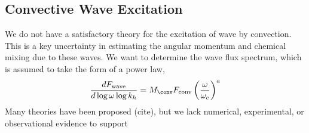 {\color{purple}
\subsection{Convective Wave Excitation}
}

We do not have a satisfactory theory for the excitation of wave by convection. This is a key uncertainty in estimating the angular momentum and chemical mixing due to these waves. We want to determine the wave flux spectrum, which is assumed to take the form of a power law,
\begin{equation}
\frac{d F_{\rm wave}}{d\log \omega \log k_h} = M_{\conv}F_{\rm conv}  \left(\frac{\omega}{\omega_c}\right)^a
\end{equation}
Many theories have been proposed (cite), but we lack numerical, experimental, or observational evidence to support  
